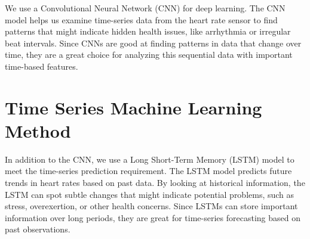 \documentclass[10pt]{extarticle}
\begin{document}
We use a Convolutional Neural Network (CNN) for deep learning. The CNN model helps us examine time-series data from the heart rate sensor to find patterns that might indicate hidden health issues, like arrhythmia or irregular beat intervals. Since CNNs are good at finding patterns in data that change over time, they are a great choice for analyzing this sequential data with important time-based features.

\section{Time Series Machine Learning Method}

In addition to the CNN, we use a Long Short-Term Memory (LSTM) model to meet the time-series prediction requirement. The LSTM model predicts future trends in heart rates based on past data. By looking at historical information, the LSTM can spot subtle changes that might indicate potential problems, such as stress, overexertion, or other health concerns. Since LSTMs can store important information over long periods, they are great for time-series forecasting based on past observations.

\newpage

\printbibliography

\newpage
\end{document}
